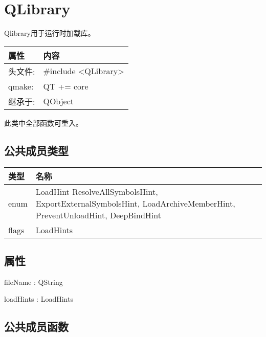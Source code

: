 \chapter{QLibrary}

Qlibrary用于运行时加载库。

\begin{tabular}{|l|l|}
\hline
属性 &	内容\\
\hline
头文件:& 	\#include <QLibrary>\\
\hline
qmake:& 	QT += core\\
\hline
继承于:& 	QObject\\
\hline
\end{tabular}

\begin{notice}
此类中全部函数可重入。
\end{notice}

\section{公共成员类型}

\begin{tabular}{|l|m{23em}|}
\hline
类型 &	名称\\
\hline
enum &	LoadHint { ResolveAllSymbolsHint, ExportExternalSymbolsHint,
       LoadArchiveMemberHint, PreventUnloadHint, DeepBindHint }\\
\hline
flags &	LoadHints \\ 
\hline
\end{tabular}

\section{属性}

\begin{compactitem}[\arr]
\item fileName : QString
\item loadHints : LoadHints
\end{compactitem}

\section{公共成员函数}

